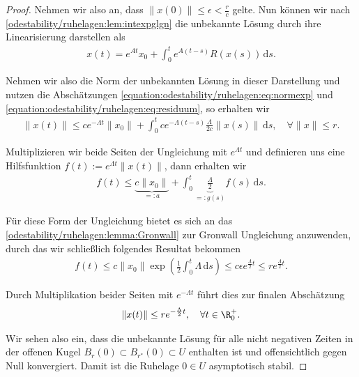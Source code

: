 \documentclass[letterpaper,10pt,german]{jupyterBook}
\begin{document}
\begin{proof}
\par
Nehmen wir also an, dass \(\|x(0)\| \leq \epsilon <\frac{r}{c}\) gelte.
Nun können wir nach \cref{odestability/ruhelagen:lem:intexpglgn} die unbekannte Lösung durch ihre Linearisierung darstellen als
\begin{align*}
x(t) = e^{At}x_0 + \int_0^t e^{A(t-s)} R(x(s))\, \mathrm{d}s.
\end{align*}
\par
Nehmen wir also die Norm der unbekannten Lösung in dieser Darstellung und nutzen die Abschätzungen \eqref{equation:odestability/ruhelagen:eq:normexp} und \eqref{equation:odestability/ruhelagen:eq:residuum}, so erhalten wir
\begin{align*}
\|x(t)\|\leq ce^{-\Lambda t}\|x_0\| + \int_0^tce^{-\Lambda (t-s)}\frac{\Lambda}{2c}\|x(s)\|\, \mathrm{d}s, \quad \forall \|x\| \leq r.
\end{align*}
\par
Multiplizieren wir beide Seiten der Ungleichung mit \(e^{\Lambda t}\) und definieren uns eine Hilfsfunktion \(f(t):=e^{\Lambda t}\|x(t)\|\), dann erhalten wir
\begin{align*}
f(t)\leq \underbrace{c\|x_0\|}_{=:a} + \int_0^t \underbrace{\frac{\Lambda}{2}}_{=:g(s)} f(s)\, \mathrm{d}s.
\end{align*}
\par
Für diese Form der Ungleichung bietet es sich an das \cref{odestability/ruhelagen:lemma:Gronwall} zur Gronwall Ungleichung anzuwenden, durch das wir schließlich folgendes Resultat bekommen
\begin{align*}
f(t) \leq c \|x_0\| \exp{\left( \frac{1}{2} \int_0^t \Lambda \, \mathrm{d}s \right) }
\leq c \epsilon e^{\frac{\Lambda}{2} t} \leq r e^{\frac{\Lambda}{2} t}.
\end{align*}
\par
Durch Multiplikation beider Seiten mit \(e^{-\Lambda t}\) führt dies zur finalen Abschätzung
\begin{align*}
 \|x(t)\|\leq re^{-\frac{\Lambda}{2}t}, \quad \forall t\in\R^+_0.
\end{align*}
\par
Wir sehen also ein, dass die unbekannte Lösung für alle nicht negativen Zeiten in der offenen Kugel \(B_r(0) \subset B_{{r^\ast}}(0) \subset U\) enthalten ist und offensichtlich gegen Null konvergiert.
Damit ist die Ruhelage \(0 \in U\) asymptotisch stabil.
\end{proof}
\end{document}
